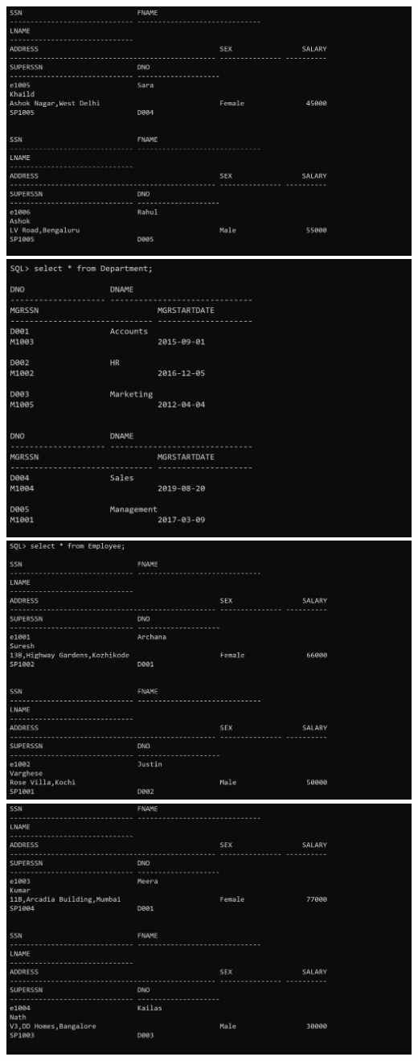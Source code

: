 \documentclass[a4paper,12pt]{report}
\begin{document}
\includegraphics[scale=0.2]{C1_op4.png}
\includegraphics[scale=0.2]{C_Dept1.png}
\includegraphics[scale=0.2]{C1_op1.png}
\includegraphics[scale=0.2]{C1_op2.png}
\end{document}
